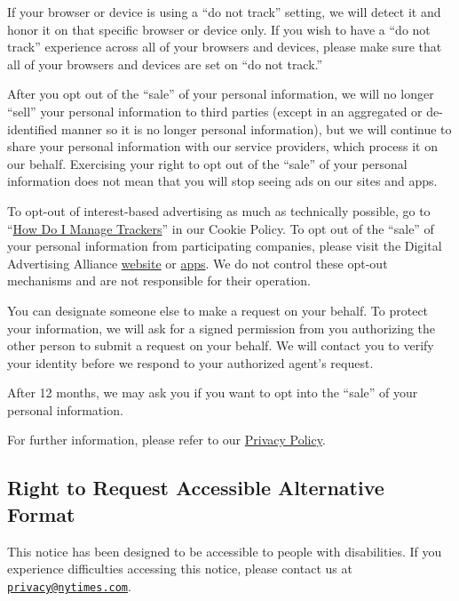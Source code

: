 If your browser or device is using a ``do not track'' setting, we will
detect it and honor it on that specific browser or device only. If you
wish to have a ``do not track'' experience across all of your browsers
and devices, please make sure that all of your browsers and devices are
set on ``do not track.''

After you opt out of the ``sale'' of your personal information, we will
no longer ``sell'' your personal information to third parties (except in
an aggregated or de-identified manner so it is no longer personal
information), but we will continue to share your personal information
with our service providers, which process it on our behalf. Exercising
your right to opt out of the ``sale'' of your personal information does
not mean that you will stop seeing ads on our sites and apps.

To opt-out of interest-based advertising as much as technically
possible, go to
``\href{http://www.nytimes.com/privacy/cookie-policy\#how-do-i-manage-trackers}{How
Do I Manage Trackers}'' in our Cookie Policy. To opt out of the ``sale''
of your personal information from participating companies, please visit
the Digital Advertising Alliance
\href{https://optout.privacyrights.info/?c=1}{website} or
\href{https://www.privacyrights.info/appchoices}{apps}. We do not
control these opt-out mechanisms and are not responsible for their
operation.

You can designate someone else to make a request on your behalf. To
protect your information, we will ask for a signed permission from you
authorizing the other person to submit a request on your behalf. We will
contact you to verify your identity before we respond to your authorized
agent's request.

After 12 months, we may ask you if you want to opt into the ``sale'' of
your personal information.

For further information, please refer to our
\href{http://www.nytimes.com/privacy/privacy-policy}{Privacy Policy}.

\hypertarget{right-to-request-accessible-alternative-format}{%
\subsection{Right to Request Accessible Alternative
Format}\label{right-to-request-accessible-alternative-format}}

This notice has been designed to be accessible to people with
disabilities. If you experience difficulties accessing this notice,
please contact us at
\href{mailto:privacy@nytimes.com}{\nolinkurl{privacy@nytimes.com}}.

